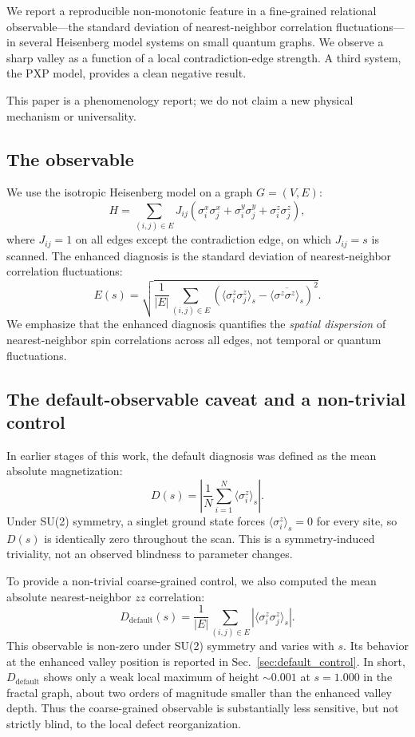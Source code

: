 \documentclass[aps,prb,reprint,superscriptaddress]{revtex4-2}
\begin{document}
We report a reproducible non-monotonic feature in a fine-grained relational observable---the standard deviation of nearest-neighbor correlation fluctuations---in several Heisenberg model systems on small quantum graphs. We observe a sharp valley as a function of a local contradiction-edge strength. A third system, the PXP model, provides a clean negative result.

This paper is a phenomenology report; we do not claim a new physical mechanism or universality.

\subsection{The observable}

We use the isotropic Heisenberg model on a graph $G=(V,E)$:
\begin{equation}
H = \sum_{(i,j)\in E} J_{ij}\left(\sigma_i^x\sigma_j^x + \sigma_i^y\sigma_j^y + \sigma_i^z\sigma_j^z\right),
\end{equation}
where $J_{ij}=1$ on all edges except the contradiction edge, on which $J_{ij}=s$ is scanned. The enhanced diagnosis is the standard deviation of nearest-neighbor correlation fluctuations:
\begin{equation}
E(s)=\sqrt{\frac{1}{|E|}\sum_{(i,j)\in E}\left(\langle\sigma_i^z\sigma_j^z\rangle_s-\overline{\langle\sigma^z\sigma^z\rangle_s}\right)^2}.
\end{equation}
We emphasize that the enhanced diagnosis quantifies the \emph{spatial dispersion} of nearest-neighbor spin correlations across all edges, not temporal or quantum fluctuations.

\subsection{The default-observable caveat and a non-trivial control}

In earlier stages of this work, the default diagnosis was defined as the mean absolute magnetization:
\begin{equation}
D(s)=\left|\frac{1}{N}\sum_{i=1}^N\langle\sigma_i^z\rangle_s\right|.
\end{equation}
Under SU(2) symmetry, a singlet ground state forces $\langle\sigma_i^z\rangle_s=0$ for every site, so $D(s)$ is identically zero throughout the scan. This is a symmetry-induced triviality, not an observed blindness to parameter changes.

To provide a non-trivial coarse-grained control, we also computed the mean absolute nearest-neighbor $zz$ correlation:
\begin{equation}
D_{\text{default}}(s)=\frac{1}{|E|}\sum_{(i,j)\in E}\left|\langle\sigma_i^z\sigma_j^z\rangle_s\right|.
\end{equation}
This observable is non-zero under SU(2) symmetry and varies with $s$. Its behavior at the enhanced valley position is reported in Sec.~\ref{sec:default_control}. In short, $D_{\text{default}}$ shows only a weak local maximum of height $\sim0.001$ at $s=1.000$ in the fractal graph, about two orders of magnitude smaller than the enhanced valley depth. Thus the coarse-grained observable is substantially less sensitive, but not strictly blind, to the local defect reorganization.
\end{document}
